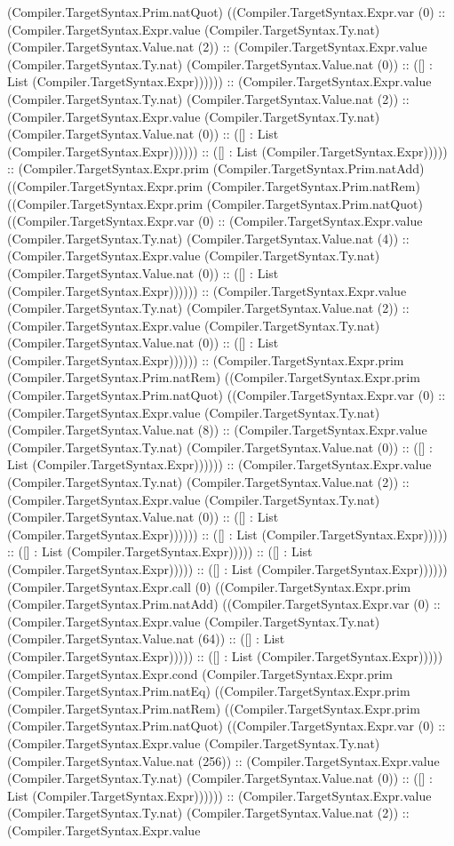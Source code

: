 \documentclass[11pt]{article}
\begin{document}
(Compiler.TargetSyntax.Prim.natQuot) ((Compiler.TargetSyntax.Expr.var (0) :: (Compiler.TargetSyntax.Expr.value (Compiler.TargetSyntax.Ty.nat) (Compiler.TargetSyntax.Value.nat (2)) :: (Compiler.TargetSyntax.Expr.value (Compiler.TargetSyntax.Ty.nat) (Compiler.TargetSyntax.Value.nat (0)) :: ([] : List (Compiler.TargetSyntax.Expr)))))) :: (Compiler.TargetSyntax.Expr.value (Compiler.TargetSyntax.Ty.nat) (Compiler.TargetSyntax.Value.nat (2)) :: (Compiler.TargetSyntax.Expr.value (Compiler.TargetSyntax.Ty.nat) (Compiler.TargetSyntax.Value.nat (0)) :: ([] : List (Compiler.TargetSyntax.Expr)))))) :: ([] : List (Compiler.TargetSyntax.Expr))))) :: (Compiler.TargetSyntax.Expr.prim (Compiler.TargetSyntax.Prim.natAdd) ((Compiler.TargetSyntax.Expr.prim (Compiler.TargetSyntax.Prim.natRem) ((Compiler.TargetSyntax.Expr.prim (Compiler.TargetSyntax.Prim.natQuot) ((Compiler.TargetSyntax.Expr.var (0) :: (Compiler.TargetSyntax.Expr.value (Compiler.TargetSyntax.Ty.nat) (Compiler.TargetSyntax.Value.nat (4)) :: (Compiler.TargetSyntax.Expr.value (Compiler.TargetSyntax.Ty.nat) (Compiler.TargetSyntax.Value.nat (0)) :: ([] : List (Compiler.TargetSyntax.Expr)))))) :: (Compiler.TargetSyntax.Expr.value (Compiler.TargetSyntax.Ty.nat) (Compiler.TargetSyntax.Value.nat (2)) :: (Compiler.TargetSyntax.Expr.value (Compiler.TargetSyntax.Ty.nat) (Compiler.TargetSyntax.Value.nat (0)) :: ([] : List (Compiler.TargetSyntax.Expr)))))) :: (Compiler.TargetSyntax.Expr.prim (Compiler.TargetSyntax.Prim.natRem) ((Compiler.TargetSyntax.Expr.prim (Compiler.TargetSyntax.Prim.natQuot) ((Compiler.TargetSyntax.Expr.var (0) :: (Compiler.TargetSyntax.Expr.value (Compiler.TargetSyntax.Ty.nat) (Compiler.TargetSyntax.Value.nat (8)) :: (Compiler.TargetSyntax.Expr.value (Compiler.TargetSyntax.Ty.nat) (Compiler.TargetSyntax.Value.nat (0)) :: ([] : List (Compiler.TargetSyntax.Expr)))))) :: (Compiler.TargetSyntax.Expr.value (Compiler.TargetSyntax.Ty.nat) (Compiler.TargetSyntax.Value.nat (2)) :: (Compiler.TargetSyntax.Expr.value (Compiler.TargetSyntax.Ty.nat) (Compiler.TargetSyntax.Value.nat (0)) :: ([] : List (Compiler.TargetSyntax.Expr)))))) :: ([] : List (Compiler.TargetSyntax.Expr))))) :: ([] : List (Compiler.TargetSyntax.Expr))))) :: ([] : List (Compiler.TargetSyntax.Expr))))) :: ([] : List (Compiler.TargetSyntax.Expr)))))) (Compiler.TargetSyntax.Expr.call (0) ((Compiler.TargetSyntax.Expr.prim (Compiler.TargetSyntax.Prim.natAdd) ((Compiler.TargetSyntax.Expr.var (0) :: (Compiler.TargetSyntax.Expr.value (Compiler.TargetSyntax.Ty.nat) (Compiler.TargetSyntax.Value.nat (64)) :: ([] : List (Compiler.TargetSyntax.Expr))))) :: ([] : List (Compiler.TargetSyntax.Expr))))) (Compiler.TargetSyntax.Expr.cond (Compiler.TargetSyntax.Expr.prim (Compiler.TargetSyntax.Prim.natEq) ((Compiler.TargetSyntax.Expr.prim (Compiler.TargetSyntax.Prim.natRem) ((Compiler.TargetSyntax.Expr.prim (Compiler.TargetSyntax.Prim.natQuot) ((Compiler.TargetSyntax.Expr.var (0) :: (Compiler.TargetSyntax.Expr.value (Compiler.TargetSyntax.Ty.nat) (Compiler.TargetSyntax.Value.nat (256)) :: (Compiler.TargetSyntax.Expr.value (Compiler.TargetSyntax.Ty.nat) (Compiler.TargetSyntax.Value.nat (0)) :: ([] : List (Compiler.TargetSyntax.Expr)))))) :: (Compiler.TargetSyntax.Expr.value (Compiler.TargetSyntax.Ty.nat) (Compiler.TargetSyntax.Value.nat (2)) :: (Compiler.TargetSyntax.Expr.value 
\end{document}
